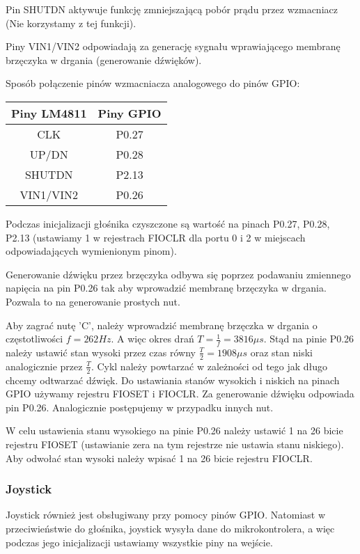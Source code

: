 \documentclass{classrep}
\begin{document}
		
		Pin SHUTDN aktywuje funkcję zmniejszającą pobór prądu przez wzmacniacz (Nie korzystamy z tej funkcji).
		
		
		Piny VIN1/VIN2 odpowiadają za generację sygnału wprawiającego
		membranę brzęczyka w drgania (generowanie dźwięków).\\
		
		
		\begin{center}
			Sposób połączenie pinów wzmacniacza analogowego do pinów GPIO:\smallskip

			\begin{tabular}{|c|c|}
				\hline 
				\textbf{Piny LM4811} & \textbf{Piny GPIO} \\ 
				\hline 
				CLK & P0.27 \\ 
				\hline 
				UP/DN & P0.28 \\ 
				\hline 
				SHUTDN & P2.13 \\ 
				\hline 
				VIN1/VIN2 & P0.26 \\ 
				\hline 
			\end{tabular} 
		\end{center}
	
		Podczas inicjalizacji głośnika czyszczone są wartość na pinach P0.27, P0.28, P2.13 (ustawiamy 1 w rejestrach FIOCLR dla portu 0 i 2 w miejscach odpowiadających wymienionym pinom).
		
		
		Generowanie dźwięku przez brzęczyka odbywa się poprzez podawaniu zmiennego napięcia na pin P0.26 tak aby
		wprowadzić membranę brzęczyka w drgania. Pozwala to na generowanie prostych nut. 
		
		
		Aby zagrać nutę 'C', należy wprowadzić membranę brzęczka w drgania o częstotliwości $f=262Hz$. A więc okres drań $T=\frac{1}{f} = 3816 \mu s$. Stąd na pinie P0.26 należy ustawić stan wysoki przez czas równy $\frac{T}{2} = 1908\mu s$ oraz stan niski analogicznie przez  $\frac{T}{2}$. Cykl należy powtarzać w zależności od tego jak długo chcemy odtwarzać dźwięk. Do ustawiania stanów wysokich i niskich na pinach GPIO używamy rejestru FIOSET i FIOCLR. Za
		generowanie dźwięku odpowiada pin P0.26. Analogicznie postępujemy w przypadku innych nut.
		
		W celu ustawienia stanu wysokiego na pinie P0.26 należy ustawić 1 na 26 bicie rejestru FIOSET (ustawianie zera na tym rejestrze nie ustawia stanu niskiego). Aby odwołać stan wysoki należy wpisać 1 na 26 bicie rejestru FIOCLR.
		\subsubsection{Joystick}
		Joystick również jest obsługiwany przy pomocy pinów GPIO. Natomiast w przeciwieństwie do głośnika, joystick wysyła dane do mikrokontrolera, a więc podczas jego inicjalizacji ustawiamy wszystkie piny na wejście.
		
\end{document}
